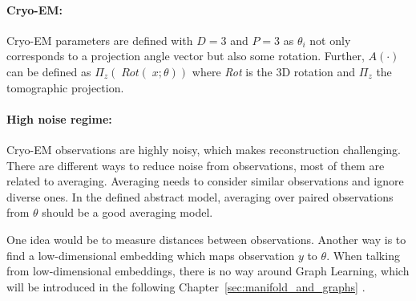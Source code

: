 \paragraph{Cryo-EM:}
Cryo-EM parameters are defined with $D=3$ and $P=3$ as $\theta_i$ not only corresponds to
a projection angle vector but also some rotation.
Further, $A(\cdot)$ can be defined as $\Pi_z \left(\; \textit{Rot}(\;x; \theta) \right)$ 
where \textit{Rot} is the 3D rotation and $\Pi_z$ the tomographic projection.


\paragraph{High noise regime:}
Cryo-EM observations are highly noisy, which makes reconstruction challenging. 
There are different ways to reduce noise from observations, most of them are related to averaging. 
Averaging needs to consider similar observations and ignore diverse ones. 
In the defined abstract model, averaging over paired observations from $\theta$ should be a good averaging model.

One idea would be to measure distances between observations.
Another way is to find a low-dimensional embedding which maps observation $y$ to $\theta$.
When talking from low-dimensional embeddings, there is no way around Graph Learning, which will be introduced
in the following Chapter~\ref{sec:manifold_and_graphs} \textit{}.

